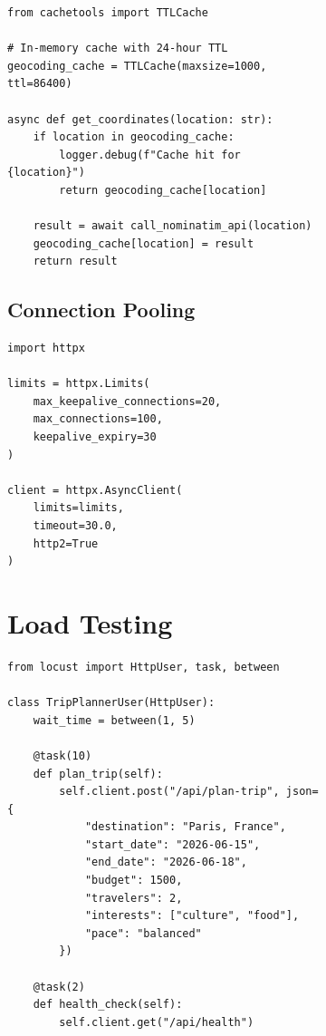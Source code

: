 \documentclass[12pt,a4paper]{report}
\begin{document}
\begin{figure}[H]
\begin{plantuml}
\begin{figure}[H]
\begin{plantuml}
\begin{lstlisting}[style=pythonstyle, caption={Geocoding Cache Implementation}]
from cachetools import TTLCache

# In-memory cache with 24-hour TTL
geocoding_cache = TTLCache(maxsize=1000, ttl=86400)

async def get_coordinates(location: str):
    if location in geocoding_cache:
        logger.debug(f"Cache hit for {location}")
        return geocoding_cache[location]
    
    result = await call_nominatim_api(location)
    geocoding_cache[location] = result
    return result
\end{lstlisting}

\subsection{Connection Pooling}

\begin{lstlisting}[style=pythonstyle, caption={HTTP Client Configuration}]
import httpx

limits = httpx.Limits(
    max_keepalive_connections=20,
    max_connections=100,
    keepalive_expiry=30
)

client = httpx.AsyncClient(
    limits=limits,
    timeout=30.0,
    http2=True
)
\end{lstlisting}

\section{Load Testing}

\begin{lstlisting}[style=pythonstyle, caption={Locust Load Test Script}]
from locust import HttpUser, task, between

class TripPlannerUser(HttpUser):
    wait_time = between(1, 5)
    
    @task(10)
    def plan_trip(self):
        self.client.post("/api/plan-trip", json={
            "destination": "Paris, France",
            "start_date": "2026-06-15",
            "end_date": "2026-06-18",
            "budget": 1500,
            "travelers": 2,
            "interests": ["culture", "food"],
            "pace": "balanced"
        })
    
    @task(2)
    def health_check(self):
        self.client.get("/api/health")
\end{lstlisting}



\end{plantuml}
\end{figure}
\end{plantuml}
\end{figure}
\end{document}
